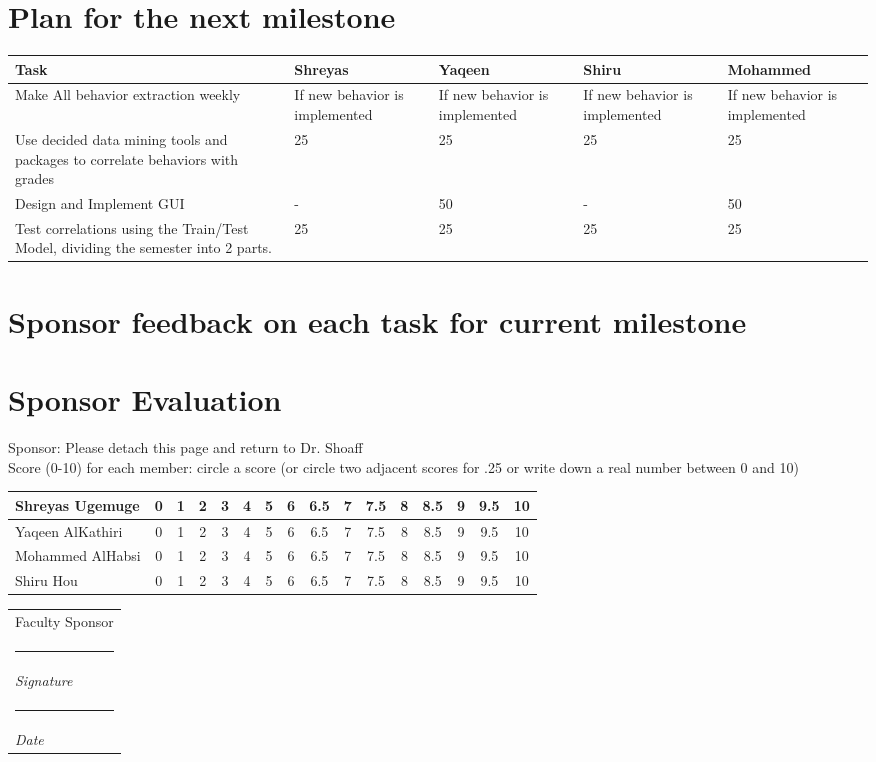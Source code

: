 \documentclass[12pt]{article}
\makeatletter
\newcommand{\namesigdate}[2][5cm]{%
  \begin{tabular}{@{}p{#1}@{}}
    #2 \\[2\normalbaselineskip] \hrule \\[0pt]
    {\small \textit{Signature}} \\ [2\normalbaselineskip] \hrule \\[0pt]
    {\small \textit{Date}}
  \end{tabular}
}
\makeatother
\begin{document}
	\section{Plan for the next milestone}
	\begin{tabularx}{\linewidth}{|X|X|X|X|X|}
	\hline	\textbf{Task} & \textbf{Shreyas} & \textbf{Yaqeen} & \textbf{Shiru} & \textbf{Mohammed} \\ \hline
	Make All behavior extraction weekly & If new behavior is implemented & If new behavior is implemented & If new behavior is implemented & If new behavior is implemented \\ \hline
	Use decided data mining tools and packages to correlate behaviors with grades & 25 & 25 & 25 & 25 \\ \hline
	Design and Implement GUI & - & 50 & - & 50 \\ \hline
	Test correlations using the Train/Test Model, dividing the semester into 2 parts. & 25 & 25&25&25\\ \hline
	\end{tabularx}


	\pagebreak
	\section{Sponsor feedback on each task for current milestone}
	\pagebreak
	\section{Sponsor Evaluation}
	Sponsor: Please detach this page and return to Dr. Shoaff \\ \hfill \break 
	Score (0-10) for each member: circle a score (or circle two adjacent scores for .25 or write down a real number between 0 and 10) \\ \hfill \break
	\begin{tabularx}{\textwidth}{|X|c|c|c|c|c|c|c|c|c|c|c|c|c|c|c|}
	\hline
	Shreyas Ugemuge & 0 & 1 &  2 & 3 & 4 & 5 & 6 & 6.5 & 7 & 7.5 & 8 & 8.5 & 9 & 9.5 & 10 \\ \hline
	Yaqeen AlKathiri & 0 & 1 &  2 & 3 & 4 & 5 & 6 & 6.5 & 7 & 7.5 & 8 & 8.5 & 9 & 9.5 & 10 \\ \hline
	Mohammed AlHabsi & 0 & 1 &  2 & 3 & 4 & 5 & 6 & 6.5 & 7 & 7.5 & 8 & 8.5 & 9 & 9.5 & 10 \\ \hline
	Shiru Hou & 0 & 1 &  2 & 3 & 4 & 5 & 6 & 6.5 & 7 & 7.5 & 8 & 8.5 & 9 & 9.5 & 10 \\ 
	\hline 
	\end{tabularx}
	\hfil \break
	\hfil \break
	\namesigdate{Faculty Sponsor}
	
\end{document}
